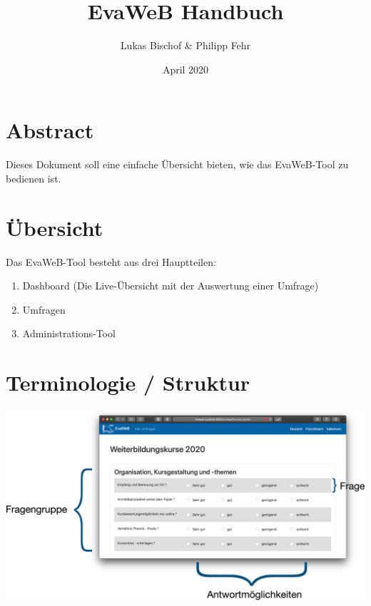 \documentclass{article}
\title{EvaWeB Handbuch}
\author{Lukas Bischof \& Philipp Fehr }
\date{April 2020}
\begin{document}
\maketitle

\section{Abstract}
Dieses Dokument soll eine einfache Übersicht bieten, wie das EvaWeB-Tool zu bedienen ist.

\section{Übersicht}
Das EvaWeB-Tool besteht aus drei Hauptteilen:
\begin{enumerate}
    \item Dashboard (Die Live-Übersicht mit der Auswertung einer Umfrage)
    \item Umfragen
    \item Administrations-Tool
\end{enumerate}

\pagebreak
\section{Terminologie / Struktur}
\includegraphics[width=\textwidth]{terminology.png}
\end{document}
